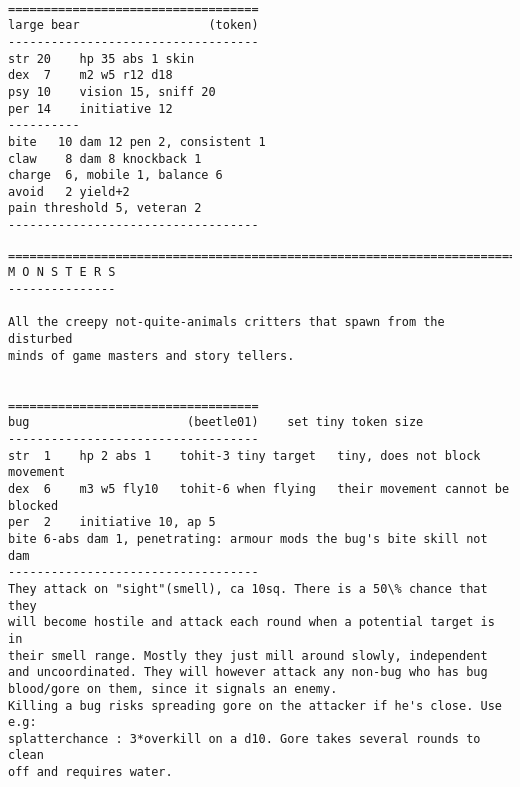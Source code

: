 \

\goodbreak \begin{samepage} \small \begin{verbatim}
===================================
large bear                  (token)
-----------------------------------
str 20    hp 35 abs 1 skin
dex  7    m2 w5 r12 d18
psy 10    vision 15, sniff 20
per 14    initiative 12
----------
bite   10 dam 12 pen 2, consistent 1
claw    8 dam 8 knockback 1
charge  6, mobile 1, balance 6
avoid   2 yield+2
pain threshold 5, veteran 2
-----------------------------------
\end{verbatim} \normalsize \end{samepage}








\clearpage
{}


\goodbreak \begin{samepage} \small \begin{verbatim}
================================================================================
M O N S T E R S
---------------

All the creepy not-quite-animals critters that spawn from the disturbed
minds of game masters and story tellers.


===================================
bug                      (beetle01)    set tiny token size
-----------------------------------
str  1    hp 2 abs 1    tohit-3 tiny target   tiny, does not block movement
dex  6    m3 w5 fly10   tohit-6 when flying   their movement cannot be blocked
per  2    initiative 10, ap 5
bite 6-abs dam 1, penetrating: armour mods the bug's bite skill not dam
-----------------------------------
They attack on "sight"(smell), ca 10sq. There is a 50\% chance that they
will become hostile and attack each round when a potential target is in
their smell range. Mostly they just mill around slowly, independent
and uncoordinated. They will however attack any non-bug who has bug
blood/gore on them, since it signals an enemy.
Killing a bug risks spreading gore on the attacker if he's close. Use e.g:
splatterchance : 3*overkill on a d10. Gore takes several rounds to clean
off and requires water.
\end{verbatim} \normalsize \end{samepage}

